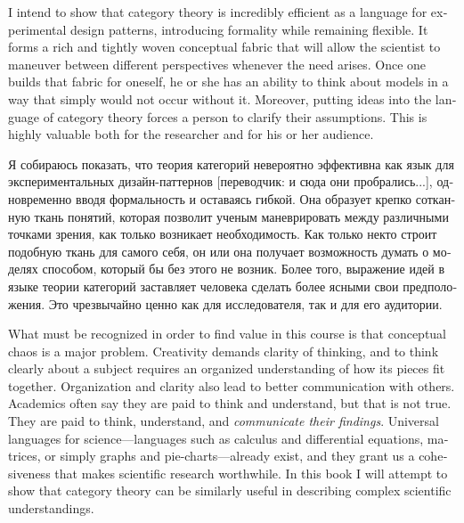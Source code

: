 \documentclass{book}
\theoremstyle{theoremENG}
\theoremstyle{lemmaENG}
\theoremstyle{propositionENG}
\theoremstyle{corollaryENG}
\theoremstyle{factENG}
\theoremstyle{remarkENG}
\theoremstyle{exampleENG}
\theoremstyle{warningENG}
\theoremstyle{questionENG}
\theoremstyle{guessENG}
\theoremstyle{answerENG}
\theoremstyle{constructionENG}
\theoremstyle{rulesENG}
\theoremstyle{excENG}
\theoremstyle{appENG}
\theoremstyle{definitionENG}
\theoremstyle{notationENG}
\theoremstyle{conjectureENG}
\theoremstyle{postulateENG}
\theoremstyle{theoremRUS}
\theoremstyle{lemmaRUS}
\theoremstyle{propositionRUS}
\theoremstyle{corollaryRUS}
\theoremstyle{factRUS}
\theoremstyle{remarkRUS}
\theoremstyle{exampleRUS}
\theoremstyle{warningRUS}
\theoremstyle{questionRUS}
\theoremstyle{guessRUS}
\theoremstyle{answerRUS}
\theoremstyle{constructionRUS}
\theoremstyle{rulesRUS}
\theoremstyle{excRUS}
\theoremstyle{appRUS}
\theoremstyle{definitionRUS}
\theoremstyle{notationRUS}
\theoremstyle{conjectureRUS}
\theoremstyle{postulateRUS}
\begin{document}
\begin{english}
I intend to show that category theory is incredibly efficient as a language for experimental design patterns, introducing formality while remaining flexible. It forms a rich and tightly woven conceptual fabric that will allow the scientist to maneuver between different perspectives whenever the need arises. Once one builds that fabric for oneself, he or she has an ability to think about models in a way that simply would not occur without it.  Moreover, putting ideas into the language of category theory forces a person to clarify their assumptions. This is highly valuable both for the researcher and for his or her audience.

\begin{russian}Я собираюсь показать, что теория категорий невероятно эффективна как язык для экспериментальных дизайн-паттернов [переводчик: и сюда они пробрались...], одновременно вводя формальность и оставаясь гибкой. Она образует крепко сотканную ткань понятий, которая позволит ученым маневрировать между различными точками зрения, как только возникает необходимость. Как только некто строит подобную ткань для самого себя, он или она получает возможность думать о моделях способом, который бы без этого не возник. Более того, выражение идей в языке теории категорий заставляет человека сделать более ясными свои предположения. Это чрезвычайно ценно как для исследователя, так и для его аудитории. \end{russian}

What must be recognized in order to find value in this course is that conceptual chaos is a major problem. Creativity demands clarity of thinking, and to think clearly about a subject requires an organized understanding of how its pieces fit together. Organization and clarity also lead to better communication with others. Academics often say they are paid to think and understand, but that is not true. They are paid to think, understand, and {\em communicate their findings}. Universal languages for science---languages such as calculus and differential equations, matrices, or simply graphs and pie-charts---already exist, and they grant us a cohesiveness that makes scientific research worthwhile. In this book I will attempt to show that category theory can be similarly useful in describing complex scientific understandings.


\end{english}
\end{document}
